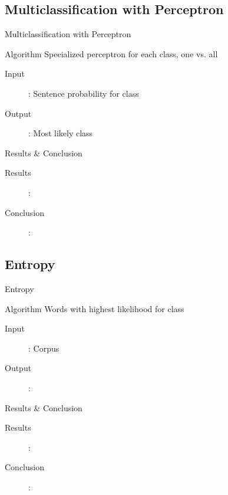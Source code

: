 \documentclass{beamer}
\begin{document}
\subsection{Multiclassification with Perceptron}
\begin{frame}{Multiclassification with Perceptron}
\begin{block}{Algorithm}
Specialized perceptron for each class, one vs. all
\end{block}
\begin{description}
\item[Input]: Sentence probability for class
\item[Output]: Most likely class
\end{description}
\end{frame}
\begin{frame}{Results \& Conclusion}
\begin{description}
\item[Results]: 
\item[Conclusion]:
\end{description}
\end{frame}

\subsection{Entropy}
\begin{frame}{Entropy}
\begin{block}{Algorithm}
Words with highest likelihood for class
\end{block}
\begin{description}
\item[Input]: Corpus
\item[Output]:
\end{description}
\end{frame}
\begin{frame}{Results \& Conclusion}
\begin{description}
\item[Results]: 
\item[Conclusion]:
\end{description}
\end{frame}

\end{document}
